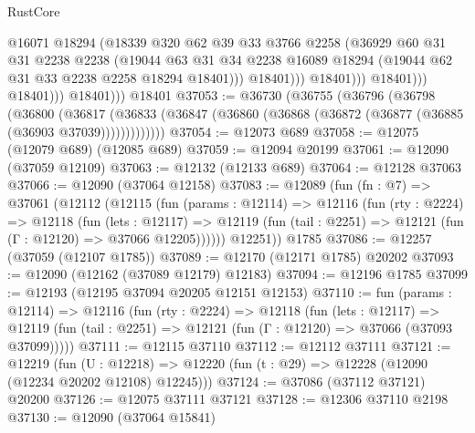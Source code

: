 \begin{lexlean}{RustCore}
\begin{coremodule}
                                @16071
                                @18294
                                (@18339
                                  @320
                                  @62
                                  @39
                                  @33
                                  @3766
                                  @2258
                                  (@36929
                                    @60
                                    @31
                                    @31
                                    @2238
                                    @2238
                                    (@19044
                                      @63
                                      @31
                                      @34
                                      @2238
                                      @16089
                                      @18294
                                      (@19044 @62 @31 @33 @2238 @2258 @18294 @18401)))
                                  @18401)))
                            @18401)))
                      @18401)))
                @18401)))
          @18401)))
    @18401
@37053 := @36730
    (@36755
      (@36796
        (@36798
          (@36800
            (@36817
              (@36833 (@36847 (@36860 (@36868 (@36872 (@36877 (@36885 (@36903 @37039)))))))))))))
@37054 := @12073 @689
@37058 := @12075 (@12079 @689) (@12085 @689)
@37059 := @12094 @20199
@37061 := @12090 (@37059 @12109)
@37063 := @12132 (@12133 @689)
@37064 := @12128 @37063
@37066 := @12090 (@37064 @12158)
@37083 := @12089
    (fun (fn : @7) =>
    @37061
      (@12112
        (@12115
          (fun (params : @12114) =>
          @12116
            (fun (rty : @2224) =>
            @12118
              (fun (lets : @12117) =>
              @12119 (fun (tail : @2251) => @12121 (fun (Γ : @12120) => @37066 @12205))))))
        @12251))
    @1785
@37086 := @12257 (@37059 (@12107 @1785))
@37089 := @12170 (@12171 @1785) @20202
@37093 := @12090 (@12162 (@37089 @12179) @12183)
@37094 := @12196 @1785
@37099 := @12193 (@12195 @37094 @20205 @12151 @12153)
@37110 := fun (params : @12114) =>
  @12116
    (fun (rty : @2224) =>
    @12118
      (fun (lets : @12117) =>
      @12119 (fun (tail : @2251) => @12121 (fun (Γ : @12120) => @37066 (@37093 @37099)))))
@37111 := @12115 @37110
@37112 := @12112 @37111
@37121 := @12219
    (fun (U : @12218) => @12220 (fun (t : @29) => @12228 (@12090 (@12234 @20202 @12108) @12245)))
@37124 := @37086 (@37112 @37121) @20200
@37126 := @12075 @37111 @37121
@37128 := @12306 @37110 @2198
@37130 := @12090 (@37064 @15841)

\end{coremodule}
\end{lexlean}
